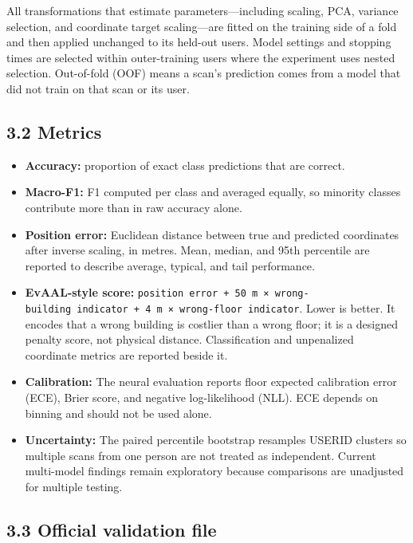\documentclass[
  10pt,
  a4paper,
]{article}
\providecommand{\tightlist}{%
  \setlength{\itemsep}{0pt}\setlength{\parskip}{0pt}}
\begin{document}
All transformations that estimate parameters---including scaling, PCA,
variance selection, and coordinate target scaling---are fitted on the
training side of a fold and then applied unchanged to its held-out
users. Model settings and stopping times are selected within
outer-training users where the experiment uses nested selection.
Out-of-fold (OOF) means a scan's prediction comes from a model that did
not train on that scan or its user.

\subsection{3.2 Metrics}\label{metrics}

\begin{itemize}
\tightlist
\item
  \textbf{Accuracy:} proportion of exact class predictions that are
  correct.
\item
  \textbf{Macro-F1:} F1 computed per class and averaged equally, so
  minority classes contribute more than in raw accuracy alone.
\item
  \textbf{Position error:} Euclidean distance between true and predicted
  coordinates after inverse scaling, in metres. Mean, median, and 95th
  percentile are reported to describe average, typical, and tail
  performance.
\item
  \textbf{EvAAL-style score:}
  \texttt{position\ error\ +\ 50\ m\ ×\ wrong-building\ indicator\ +\ 4\ m\ ×\ wrong-floor\ indicator}.
  Lower is better. It encodes that a wrong building is costlier than a
  wrong floor; it is a designed penalty score, not physical distance.
  Classification and unpenalized coordinate metrics are reported beside
  it.
\item
  \textbf{Calibration:} The neural evaluation reports floor expected
  calibration error (ECE), Brier score, and negative log-likelihood
  (NLL). ECE depends on binning and should not be used alone.
\item
  \textbf{Uncertainty:} The paired percentile bootstrap resamples USERID
  clusters so multiple scans from one person are not treated as
  independent. Current multi-model findings remain exploratory because
  comparisons are unadjusted for multiple testing.
\end{itemize}

\subsection{3.3 Official validation
file}\label{official-validation-file}
\end{document}
